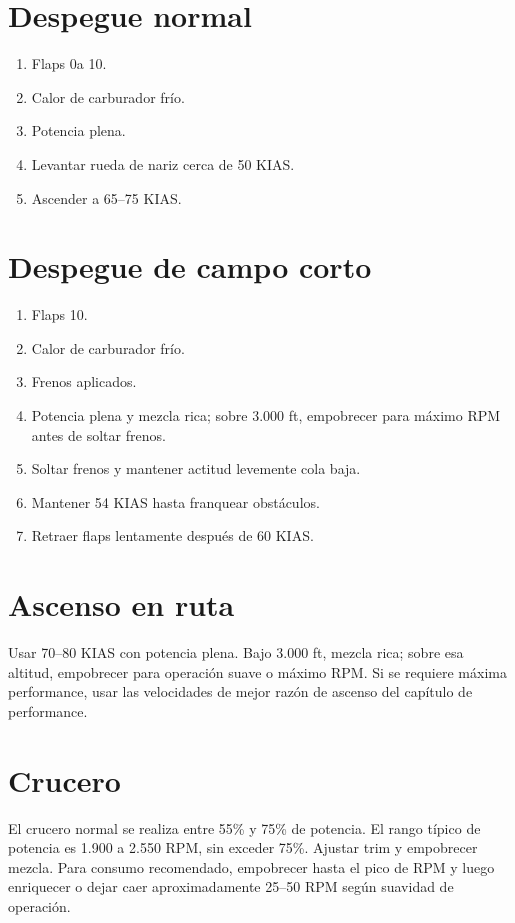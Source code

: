 \documentclass[11pt,oneside]{book}
\newenvironment{checklist}{\begin{enumerate}[label=\arabic*.]}{\end{enumerate}}
\begin{document}
\section{Despegue normal}

\begin{checklist}
\item Flaps 0\textdegree a 10\textdegree.
\item Calor de carburador frío.
\item Potencia plena.
\item Levantar rueda de nariz cerca de 50 KIAS.
\item Ascender a 65--75 KIAS.
\end{checklist}

\section{Despegue de campo corto}

\begin{checklist}
\item Flaps 10\textdegree.
\item Calor de carburador frío.
\item Frenos aplicados.
\item Potencia plena y mezcla rica; sobre 3.000 ft, empobrecer para máximo RPM antes de soltar frenos.
\item Soltar frenos y mantener actitud levemente cola baja.
\item Mantener 54 KIAS hasta franquear obstáculos.
\item Retraer flaps lentamente después de 60 KIAS.
\end{checklist}

\section{Ascenso en ruta}

Usar 70--80 KIAS con potencia plena. Bajo 3.000 ft, mezcla rica; sobre esa altitud, empobrecer para operación suave o máximo RPM. Si se requiere máxima performance, usar las velocidades de mejor razón de ascenso del capítulo de performance.

\section{Crucero}

El crucero normal se realiza entre 55\% y 75\% de potencia. El rango típico de potencia es 1.900 a 2.550 RPM, sin exceder 75\%. Ajustar trim y empobrecer mezcla. Para consumo recomendado, empobrecer hasta el pico de RPM y luego enriquecer o dejar caer aproximadamente 25--50 RPM según suavidad de operación.
\end{document}
